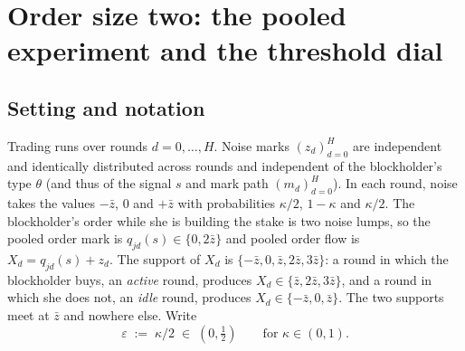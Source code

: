 
\providecommand{\Eop}{\mathbb{E}}
\providecommand{\Prb}{\mathbb{P}}
\providecommand{\ind}{\mathbf{1}}
\providecommand{\Dact}{\Delta^{\mathrm{act}}}
\providecommand{\Wrev}{\mathcal{W}}
\providecommand{\Grev}{\mathcal{G}}

\makeatletter
{}
\makeatother

\section{Order size two: the pooled experiment and the threshold dial}
\label{sec:pf-garbling}

\subsection*{Setting and notation}
\label{sec:pf-garbling-setup}

Trading runs over rounds $d = 0,\ldots,H$. Noise marks $(z_d)_{d=0}^H$ are independent and
identically distributed across rounds and independent of the blockholder's type $\theta$ (and thus
of the signal $s$ and mark path $(m_d)_{d=0}^H$). In each round, noise takes the values $-\bar z$,
$0$ and $+\bar z$ with probabilities $\kappa/2$, $1-\kappa$ and $\kappa/2$. The blockholder's order
while she is building the stake is two noise lumps, so the pooled order mark is
$q_{jd}(s) \in \{0, 2\bar z\}$ and pooled order flow is $X_d = q_{jd}(s) + z_d$. The support of $X_d$ is
$\{-\bar z, 0, \bar z, 2\bar z, 3\bar z\}$: a round in which the blockholder buys, an
\emph{active} round, produces $X_d \in \{\bar z, 2\bar z, 3\bar z\}$, and a round in which she
does not, an \emph{idle} round, produces $X_d \in \{-\bar z, 0, \bar z\}$. The two supports meet
at $\bar z$ and nowhere else. Write
\begin{equation}
\label{eq:g-eps}
\varepsilon \;:=\; \kappa/2 \;\in\;(0,\tfrac12) \qquad\text{for }\kappa\in(0,1).
\end{equation}


